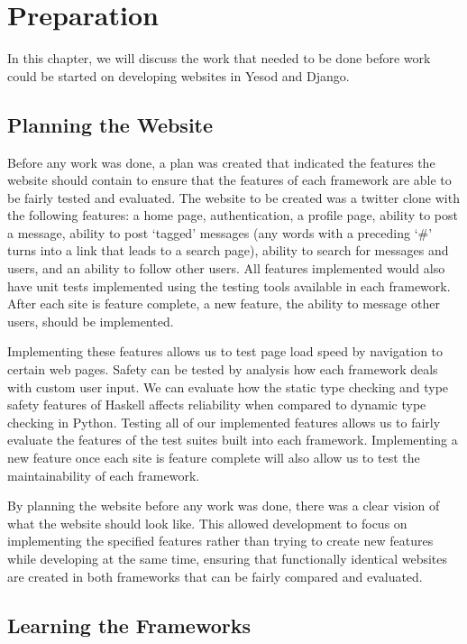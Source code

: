 \chapter{Preparation}
\label{chap:Preparation}

In this chapter, we will discuss the work that needed to be done before work could
be started on developing websites in Yesod and Django.

\section{Planning the Website}

Before any work was done, a plan was created that indicated the features the
website should contain to ensure that the features of each framework are able
to be fairly tested and evaluated. The website to be created was a twitter
clone with the following features: a home page, authentication, a profile page,
ability to post a message, ability to post `tagged' messages (any words with
a preceding `\#' turns into a link that leads to a search page),
ability to search for messages and users, and an ability to follow other users.
All features implemented would also have unit tests implemented using the
testing tools available in each framework. After each site is feature complete,
a new feature, the ability to message other users, should be implemented.

Implementing these features allows us to test page load speed by navigation
to certain web pages. Safety can be tested by analysis how each framework deals with custom
user input. We can evaluate how the static type checking and type safety features of 
Haskell affects reliability when compared to dynamic type checking in Python. Testing
all of our implemented features allows us to fairly evaluate the features of the
test suites built into each framework. Implementing a new feature once each
site is feature complete will also allow us to test the maintainability of
each framework.

By planning the website before any work was done, there was a clear vision of
what the website should look like. This allowed development to focus on implementing
the specified features rather than trying to create new features while developing
at the same time, ensuring that functionally identical websites are created in both
frameworks that can be fairly compared and evaluated.

\section{Learning the Frameworks}

